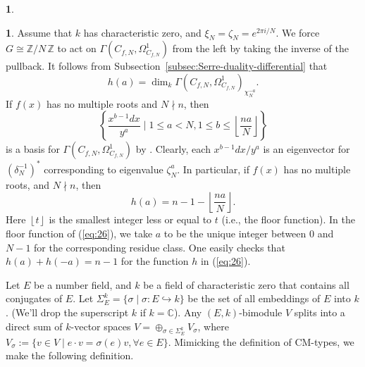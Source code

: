 \documentclass{amsart}[11pt]
\theoremstyle{definition}
\newtheorem{sect}[thm]{}
\numberwithin{equation}{section}
\theoremstyle{notitle}
\begin{document}
\begin{sect}
\begin{sect}\label{subsec:explicit-multiplicity-differential} Assume that $k$ has characteristic zero, and
  $\xi_N=\zeta_N=e^{2\pi i/N}$.  We force $G\cong {\mathbb{Z}/ {N}\, \mathbb{Z}}$ to act on
  $\Gamma(C_{f,N}, \Omega_{C_{f,N}}^1)$ from the left by taking the
  inverse of the pullback.  It follows from
  Subsection~\ref{subsec:Serre-duality-differential} that
  \[h(a)= \dim_k \Gamma(C_{f,N}, \Omega_{C_{f,N}}^1)_{\chi_N^{-a}}.\]
  If $f(x)$ has no multiple roots and $N\nmid n$, then 
  \begin{equation}
    \label{eq:basis-of-diff-first-kind}
 \left\{\frac{x^{b-1}dx}{y^a}\mid 1\leq a<N, 1\leq b\leq
    {\left\lfloor {\frac{na}{N}} \right\rfloor} \right\}
  \end{equation}
  is a basis for $\Gamma(C_{f,N}, \Omega_{C_{f,N}}^1)$ by
  \cite[Proposition 2]{MR1357406}. Clearly, each $x^{b-1}dx/y^a$ is an
  eigenvector for $(\delta_N^{-1})^*$ corresponding to eigenvalue
  $\zeta_N^a$.
  In particular, if $f(x)$ has no multiple roots, and $N\nmid n$, then
     \begin{equation}
       \label{eq:26}
       h(a)=
       n-1-{\left\lfloor {\frac{na}{N}} \right\rfloor}.
     \end{equation}
  Here ${\left\lfloor {t} \right\rfloor}$ is the smallest integer less or equal to $t$ (i.e.,
  the floor function). In the floor function of (\ref{eq:26}), we
  take $a$ to be the unique integer between 0 and $N-1$ for the
  corresponding residue class. One easily checks that $h(a)+h(-a)=
  n-1$ for the function $h$ in (\ref{eq:26}).
  \end{sect}

  
  
  
  
  
  
  
  
  
  
  
  
  
  
  
  

  Let $E$ be a number field, and $k$ be a field of characteristic zero
  that contains all conjugates of $E$. Let $\Sigma_E^k=\{ \sigma \mid
  \sigma: E\hookrightarrow k\}$ be the set of all embeddings of $E$
  into $k$. (We'll drop the superscript $k$ if $k={\mathbb{C}}$).  Any $(E,
  k)$-bimodule $V$ splits into a direct sum of $k$-vector spaces
  $V=\oplus_{\sigma \in \Sigma_E^k} V_\sigma$, where $V_\sigma:=\{
  v\in V \mid e\cdot v = \sigma(e)v, \forall e\in E\}$. Mimicking the
  definition of CM-types, we make the following definition.


\end{sect}
\end{document}
